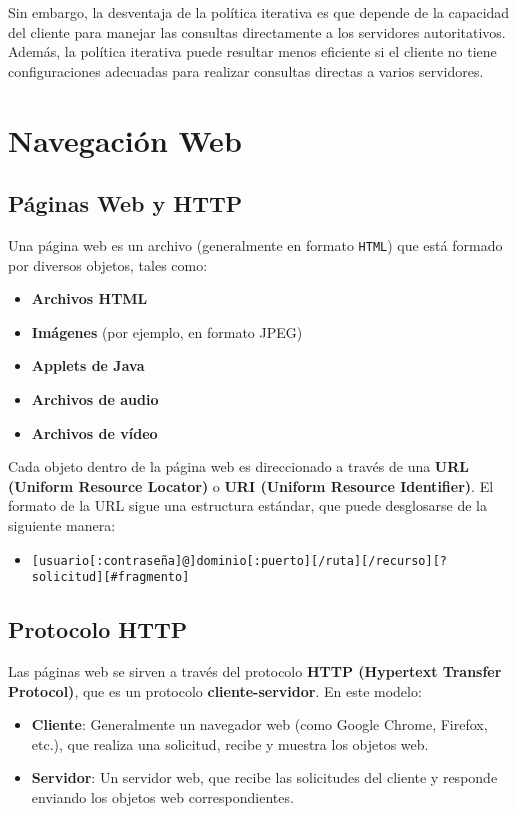 \documentclass[a4paper,12pt]{article}
\begin{document}
Sin embargo, la desventaja de la política iterativa es que depende de la capacidad del cliente para manejar las consultas directamente a los servidores autoritativos. Además, la política iterativa puede resultar menos eficiente si el cliente no tiene configuraciones adecuadas para realizar consultas directas a varios servidores.

\section{Navegación Web}

\subsection{Páginas Web y HTTP}

Una página web es un archivo (generalmente en formato \texttt{HTML}) que está formado por diversos objetos, tales como:

\begin{itemize}
    \item \textbf{Archivos HTML}
    \item \textbf{Imágenes} (por ejemplo, en formato JPEG)
    \item \textbf{Applets de Java}
    \item \textbf{Archivos de audio}
    \item \textbf{Archivos de vídeo}
\end{itemize}

Cada objeto dentro de la página web es direccionado a través de una \textbf{URL (Uniform Resource Locator)} o \textbf{URI (Uniform Resource Identifier)}. El formato de la URL sigue una estructura estándar, que puede desglosarse de la siguiente manera:

\begin{itemize}
    \item \texttt{[usuario[:contrase\~na]@]dominio[:puerto][/ruta][/recurso][?solicitud][\#fragmento]}
\end{itemize}

\subsection{Protocolo HTTP}
Las páginas web se sirven a través del protocolo \textbf{HTTP (Hypertext Transfer Protocol)}, que es un protocolo \textbf{cliente-servidor}. En este modelo:

\begin{itemize}
    \item \textbf{Cliente}: Generalmente un navegador web (como Google Chrome, Firefox, etc.), que realiza una solicitud, recibe y muestra los objetos web.
    \item \textbf{Servidor}: Un servidor web, que recibe las solicitudes del cliente y responde enviando los objetos web correspondientes.
\end{itemize}
\end{document}
